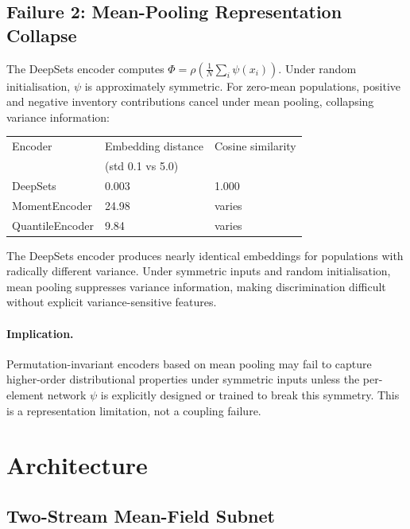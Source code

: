 \documentclass[11pt,a4paper]{article}
\begin{document}
\subsection{Failure 2: Mean-Pooling Representation Collapse}

The DeepSets encoder computes $\Phi = \rho(\frac{1}{N}\sum_i \psi(x_i))$. Under random initialisation, $\psi$ is approximately symmetric. For zero-mean populations, positive and negative inventory contributions cancel under mean pooling, collapsing variance information:

\begin{center}
\begin{tabular}{lll}
\toprule
Encoder & Embedding distance & Cosine similarity \\
& (std 0.1 vs 5.0) & \\
\midrule
DeepSets & 0.003 & 1.000 \\
MomentEncoder & 24.98 & varies \\
QuantileEncoder & 9.84 & varies \\
\bottomrule
\end{tabular}
\end{center}

The DeepSets encoder produces nearly identical embeddings for populations with radically different variance. Under symmetric inputs and random initialisation, mean pooling suppresses variance information, making discrimination difficult without explicit variance-sensitive features.

\paragraph{Implication.} Permutation-invariant encoders based on mean pooling may fail to capture higher-order distributional properties under symmetric inputs unless the per-element network $\psi$ is explicitly designed or trained to break this symmetry. This is a representation limitation, not a coupling failure.

\section{Architecture}
\label{sec:architecture}

\subsection{Two-Stream Mean-Field Subnet}
\end{document}
